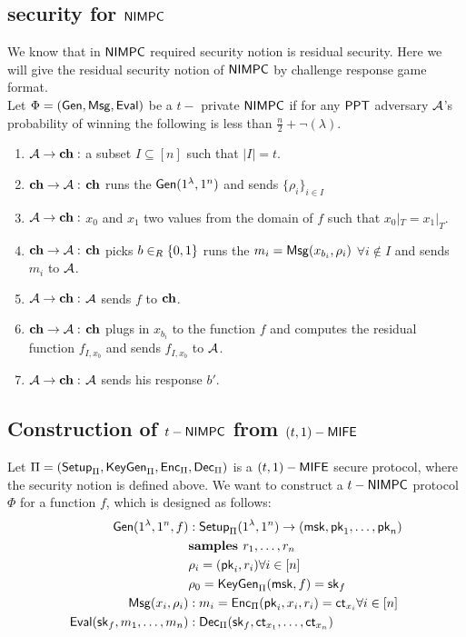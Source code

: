 \subsection{security for $\mathsf{NIMPC}$}
We know that in $\mathsf{NIMPC}$ required security notion is residual security. Here we will give the residual security notion of $\mathsf{NIMPC}$ by challenge response game format.\\
Let $\Phi=(\mathsf{Gen}, \mathsf{Msg}, \mathsf{Eval})$ be a $t-$ private $\mathsf{NIMPC}$ if for any $\mathsf{PPT}$ adversary $\mathcal{A}$'s probability of winning the following is less than $\frac{n}{2}+\neg(\lambda)$.
\begin{enumerate}
	\item $\mathcal{A} \rightarrow \mathbf{ch}:$ a subset $I\subseteq [n]$ such that $|I|=t$.
	\item $\mathbf{ch} \rightarrow \mathcal{A}:$ $\mathbf{ch}$ runs the $\mathsf{Gen}(1^{\lambda}, 1^n)$ and sends $\{\rho_i\}_{i\in I}$
	\item $\mathcal{A} \rightarrow \mathbf{ch}:$ $x_0$ and $x_1$ two values from the domain of $f$ such that $x_0|_T = x_1|_T$.
	\item $\mathbf{ch} \rightarrow \mathcal{A}:$ $\mathbf{ch}$ picks $b \in_R \{0,1\}$ runs the $m_i=\mathsf{Msg}(x_{b_i},\rho_i)$ $\forall i \notin I$ and sends $m_i$ to $\mathcal{A}$.
	\item $\mathcal{A} \rightarrow \mathbf{ch}:$ $\mathcal{A}$ sends $f$ to $\mathbf{ch}$.
	\item $\mathbf{ch} \rightarrow \mathcal{A}:$ $\mathbf{ch}$ plugs in $x_{b_i}$ to the function $f$ and computes the residual function $f_{I,x_b}$ and sends $f_{I,x_b}$ to $\mathcal{A}$.
	\item $\mathcal{A} \rightarrow \mathbf{ch}:$ $\mathcal{A}$ sends his response $b'$. 
\end{enumerate}
\subsection{Construction of $t-\mathsf{NIMPC}$ from $(t,1)-\mathsf{MIFE}$}
Let $\Pi=(\mathsf{Setup}_{\Pi}, \mathsf{KeyGen}_{\Pi}, \mathsf{Enc}_{\Pi}, \mathsf{Dec}_{\Pi})$ is a $(t,1)-\mathsf{MIFE}$ secure protocol, where the security notion is defined above. We want to construct a $t-\mathsf{NIMPC}$ protocol $\Phi$ for a function $f$, which is designed as follows:
\begin{align*}
	\mathsf{Gen}(1^{\lambda},1^n,f) &:\mathsf{Setup}_{\Pi}(1^{\lambda},1^n) \rightarrow (\mathsf{msk}, \mathsf{pk}_1,\ldots, \mathsf{pk}_n)\\
		&\textbf{samples } r_1,\ldots,r_n\\
		&\rho_i = (\mathsf{pk}_i, r_i) \forall i\in [n]\\
		&\rho_0 = \mathsf{KeyGen}_{\Pi}(\mathsf{msk}, f)= \mathsf{sk}_f\\
	\mathsf{Msg}(x_i,\rho_i) &: m_i=\mathsf{Enc}_{\Pi}(\mathsf{pk}_i, x_i, r_i) = \mathsf{ct}_{x_i} \forall i\in[n]\\
	\mathsf{Eval}(\mathsf{sk}_f,m_1,\ldots,m_n) &: \mathsf{Dec}_{\Pi}(\mathsf{sk}_f, \mathsf{ct}_{x_1},\ldots, \mathsf{ct}_{x_n})\\
\end{align*}


